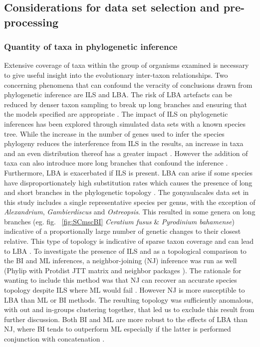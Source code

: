 \documentclass[12pt]{article}
\begin{document}
\subsection{Considerations for data set selection and pre-processing}
\subsubsection{Quantity of taxa in phylogenetic inference}
Extensive coverage of taxa within the group of organisms examined is necessary to give useful insight into the evolutionary inter-taxon relationships.
Two concerning phenomena that can confound the veracity of conclusions drawn from phylogenetic inference are ILS and LBA. 
The risk of LBA artefacts can be reduced by denser taxon sampling to break up long branches and ensuring that the models specified are appropriate \cite{heath2008taxon}. 
The impact of ILS on phylogenetic inferences has been explored through simulated data sets with a known species tree. 
While the increase in the number of genes used to infer the species phylogeny reduces the interference from ILS in the results, an increase in taxa and an even distribution thereof has a greater impact \cite{maddison2006inferring}.
However the addition of taxa can also introduce more long branches that confound the inference \cite{heath2008taxon}. 
Furthermore, LBA is exacerbated if ILS is present. 
LBA can arise if some species have disproportionately high substitution rates which causes the presence of long and short branches in the phylogenetic topology \cite{liu2014coalescent}. 
The gonyaulacales data set in this study includes a single representative species per genus, with the exception of \textit{Alexandrium}, \textit{Gambierdiscus} and \textit{Ostreopsis}. 
This resulted in some genera on long branches (eg. fig. ~\ref{fig:SCmscBI} \textit{Ceratium fusus} \& \textit{Pyrodinium bahamense}) indicative of a proportionally large number of genetic changes to their closest relative.
This type of topology is indicative of sparse taxon coverage and can lead to LBA \cite{heath2008taxon}. 
To investigate the presence of ILS and as a topological comparison to the BI and ML inferences, a neighbor-joining (NJ) inference was run as well (Phylip with Protdist JTT matrix and neighbor packages \cite{felsenstein2005phylip}). 
The rationale for wanting to include this method was that NJ can recover an accurate species topology despite ILS where ML would fail  \cite{mendes2017concatenation}.
However NJ is more susceptible to LBA than ML or BI methods. 
The resulting topology was sufficiently anomalous, with out and in-groups clustering together, that led us to exclude this result from further discussion. 
Both BI and ML are more robust to the effects of LBA than NJ, where BI tends to outperform ML especially if the latter is performed conjunction with concatenation \cite{kubatko2007inconsistency,roch2015likelihood}. 
\end{document}
